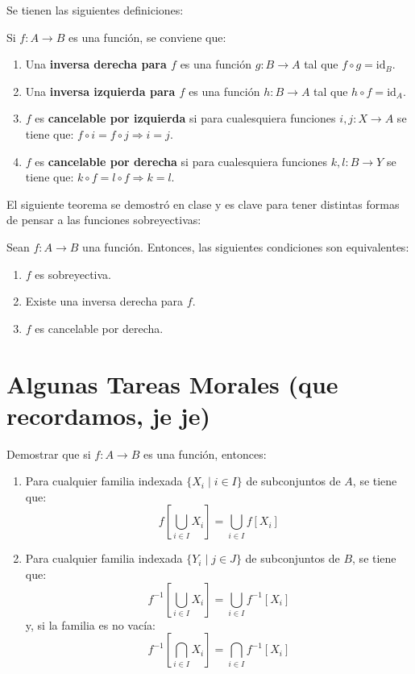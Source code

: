 \documentclass[letterpaper,DIV=14,headsepline,12pt]{scrartcl}
\providecommand\tq{\;|\;}
\newcommand{\id}{\mathrm{id}}
\begin{document}
    Se tienen las siguientes definiciones:

    \begin{definicion}
        Si $f:A \to B$ es una función, se conviene que:
        \begin{enumerate}
            \item Una \textbf{inversa derecha para $f$} es una función $g:B \to A$ tal que $f \circ g = \id_B$.
            \item Una \textbf{inversa izquierda para $f$} es una función $h:B \to A$ tal que $h \circ f = \id_A$.
            \item $f$ es \textbf{cancelable por izquierda} si para cualesquiera funciones $i,j:X \to A$ se tiene que: $f \circ i = f \circ j \Rightarrow i=j$.
            \item $f$ es \textbf{cancelable por derecha} si para cualesquiera funciones $k,l:B \to Y$ se tiene que: $k \circ f = l \circ f \Rightarrow k=l$.
        \end{enumerate}
    \end{definicion}

    El siguiente teorema se demostró en clase y es clave para tener distintas formas de pensar a las funciones sobreyectivas:

    \begin{teorema}\label{teo:sobre}
        Sean $f:A \to B$ una función. Entonces, las siguientes condiciones son equivalentes:
        \begin{enumerate}
            \item $f$ es sobreyectiva.
            \item Existe una inversa derecha para $f$.
            \item $f$ es cancelable por derecha.
        \end{enumerate}
    \end{teorema}

    \section{Algunas Tareas Morales (que recordamos, je je)}

    \begin{ejercicio}
        Demostrar que si $f:A \to B$ es una función, entonces:
        \begin{enumerate}
            \item Para cualquier familia indexada $\{ X_i \tq i \in I\}$ de subconjuntos de $A$, se tiene que:
            \[ f\left[ \bigcup_{i \in I} X_i \right] = \bigcup_{i \in I} f[X_i] \]
            \item Para cualquier familia indexada $\{ Y_i \tq j \in J\}$ de subconjuntos de $B$, se tiene que:
            \[ f^{-1}\left[ \bigcup_{i \in I} X_i \right] = \bigcup_{i \in I} f^{-1}[X_i] \]
            y, si la familia es no vacía:
            \[ f^{-1}\left[ \bigcap_{i \in I} X_i \right] = \bigcap_{i \in I} f^{-1}[X_i] \]
        \end{enumerate}
    \end{ejercicio}
\end{document}
